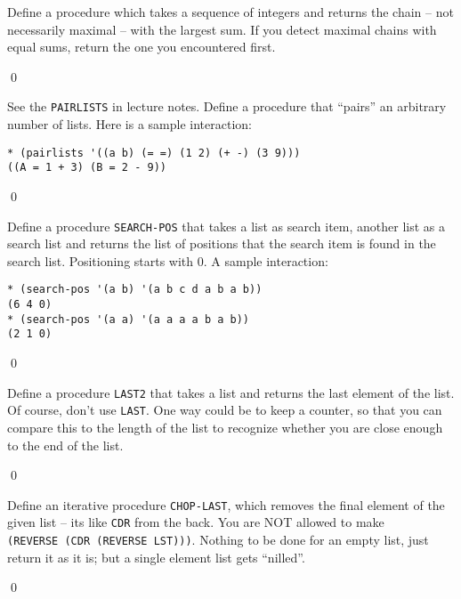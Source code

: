 \documentclass[a4paper,11pt]{article}
\begin{document}
\begin{uexercise}[*]

Define a procedure which takes a sequence of integers and returns the
chain  -- not necessarily maximal -- with the largest sum. If you
detect maximal chains with equal sums, return the one you encountered
first.

\qed
\end{uexercise}

\begin{uexercise}
See the \Verb+PAIRLISTS+ in lecture notes. Define a procedure that ``pairs'' an arbitrary number of lists. Here is a sample interaction:

{\small
\begin{Verbatim}
* (pairlists '((a b) (= =) (1 2) (+ -) (3 9)))
((A = 1 + 3) (B = 2 - 9))
\end{Verbatim}
}

\qed
\end{uexercise}

\begin{uexercise}
Define a procedure \Verb+SEARCH-POS+ that takes a list as search item, another list as a search list and returns the list of positions that the search item is found in the search list. Positioning starts with 0. A sample interaction:

{\small
\begin{Verbatim}
* (search-pos '(a b) '(a b c d a b a b))
(6 4 0)
* (search-pos '(a a) '(a a a a b a b))
(2 1 0)
\end{Verbatim}
}

\qed
\end{uexercise}

\begin{uexercise}
Define a procedure \Verb+LAST2+ that takes a list and returns the last element of the list. Of course, don't use \Verb+LAST+. One way could be to keep a counter, so that you can compare this to the length of the list to recognize whether you are close enough to the end of the list.

\qed
\end{uexercise}

\begin{uexercise}
Define an iterative procedure \Verb+CHOP-LAST+, which removes the final element of the given list -- its like \Verb+CDR+ from the back. You are NOT allowed to make\\ \Verb+(REVERSE (CDR (REVERSE LST)))+. Nothing to be done for an empty list, just return it as it is; but a single element list gets ``nilled''.

\qed
\end{uexercise}
\end{document}
